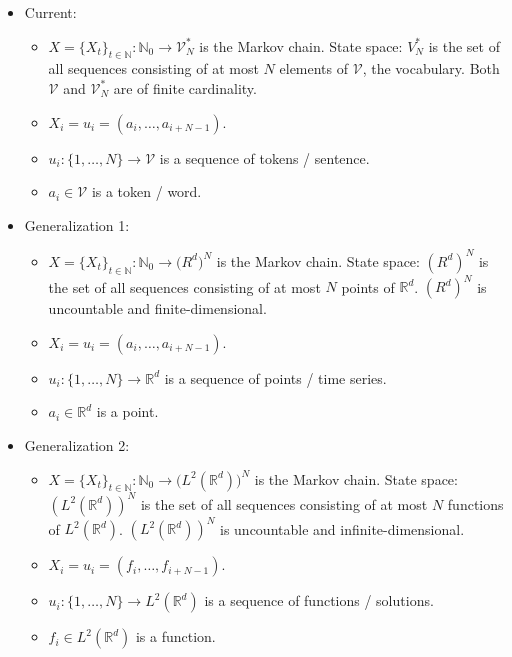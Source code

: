 \documentclass{article}
\begin{document}
\begin{itemize}
    \item Current:    
    \begin{itemize}
        \item $X = \{X_t\}_{t \in \mathbb N} :\mathbb N_0 \to \mathcal V^*_N$ is the Markov chain. \newline
        State space: $V^*_N$ is the set of all sequences consisting of at most $N$ elements of $\mathcal V$, the vocabulary. Both $\mathcal V$ and $\mathcal V^*_N$ are of finite cardinality.
        \item $X_i = u_i = (a_i,\ldots,a_{i+N-1})$.
        \item $u_i:\{1,\ldots,N\}\to \mathcal V$ is a sequence of tokens / sentence.
        \item $a_i \in \mathcal V$ is a token / word.
    \end{itemize}
    \item Generalization 1:    
    \begin{itemize}
        \item $X = \{X_t\}_{t \in \mathbb N} :\mathbb N_0 \to \mathbb (R^d)^N$ is the Markov chain. \newline
        State space: $(R^d)^N$ is the set of all sequences consisting of at most $N$ points of $\mathbb R^d$. $(R^d)^N$ is uncountable and finite-dimensional.
        \item $X_i = u_i = (a_i,\ldots,a_{i+N-1})$.
        \item $u_i:\{1,\ldots,N\}\to \mathbb R^d$ is a sequence of points / time series.
        \item $a_i \in \mathbb R^d$ is a point.
    \end{itemize}
    \item Generalization 2:
    \begin{itemize}
        \item $X = \{X_t\}_{t \in \mathbb N} :\mathbb N_0 \to \mathbb (L^2(\mathbb R^d))^N$ is the Markov chain. \newline
        State space: $(L^2(\mathbb R^d))^N$ is the set of all sequences consisting of at most $N$ functions of $L^2(\mathbb R^d)$. $(L^2(\mathbb R^d))^N$ is uncountable and infinite-dimensional.
        \item $X_i = u_i = (f_i,\ldots,f_{i+N-1})$.
        \item $u_i:\{1,\ldots,N\}\to L^2(\mathbb R^d)$ is a sequence of functions / solutions.
        \item $f_i \in L^2(\mathbb R^d)$ is a function.
    \end{itemize}
\end{itemize}
\end{document}
